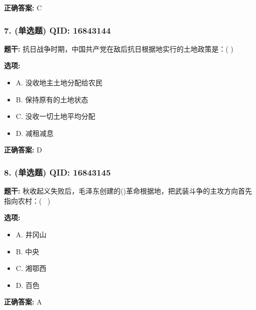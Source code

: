 \documentclass[12pt,UTF8]{ctexart}
\begin{document}
\textbf{正确答案:}
C

\vspace{0.3em}\hrulefill\vspace{0.7em}

\subsubsection*{7. (单选题) \small QID: 16843144}

\textbf{题干:}
抗日战争时期，中国共产党在敌后抗日根据地实行的土地政策是：( )

\textbf{选项:}
\begin{itemize}[leftmargin=*]

  \item A. 没收地主土地分配给农民

  \item B. 保持原有的土地状态

  \item C. 没收一切土地平均分配

  \item D. 减租减息

\end{itemize}

\textbf{正确答案:}
D

\vspace{0.3em}\hrulefill\vspace{0.7em}

\subsubsection*{8. (单选题) \small QID: 16843145}

\textbf{题干:}
秋收起义失败后，毛泽东创建的()革命根据地，把武装斗争的主攻方向首先指向农村：(  )

\textbf{选项:}
\begin{itemize}[leftmargin=*]

  \item A. 井冈山

  \item B. 中央

  \item C. 湘鄂西

  \item D. 百色

\end{itemize}

\textbf{正确答案:}
A

\vspace{0.3em}\hrulefill\vspace{0.7em}
\end{document}
